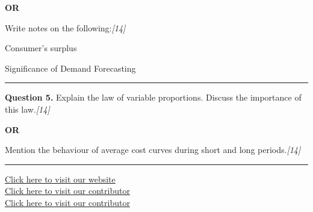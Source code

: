 \documentclass[11pt,a4paper]{article}
\newcommand{\pts}[1]{\hfill   \textit{[#1]}}
\begin{document}
\centerline{   \textbf{OR}}

Write notes on the following:\pts{14}

\begin{parts}
  \item Consumer's surplus
  \item Significance of Demand Forecasting
\end{parts}

\medskip\rule{\linewidth}{0.2pt}




\noindent   \textbf{Question 5.}
Explain the law of variable proportions. Discuss the importance of this law.\pts{14}

\centerline{   \textbf{OR}}

Mention the behaviour of average cost curves during short and long periods.\pts{14}

\vfill
\rule{\linewidth}{0.4pt}

\begin{center}\small
\href{https://bhu-exam.vercel.app/}{Click here to visit our website}\\[4pt]
\href{https://me-aryan.vercel.app/}{Click here to visit our contributor}\\[4pt]
\href{https://quashan-me.vercel.app/}{Click here to visit our contributor}
\end{center}
\end{document}
